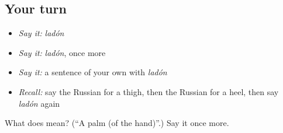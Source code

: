\subsection*{Your turn}
\begin{itemize}
\raggedright
  \item \emph{Say it:} \emph{ladón}
  \item \emph{Say it:} \emph{ladón}, once more
  \item \emph{Say it:} a sentence of your own with \emph{ladón}
  \item \emph{Recall:} say the Russian for a thigh, then the Russian for a heel, then say \emph{ladón} again
\end{itemize}

\begin{tcolorbox}[breakable,colback=teal!4,colframe=teal!35!black,title={Before you move on}]
What does  mean? (\textquotedblleft{}A palm (of the hand)\textquotedblright{}.) Say it once more.
\end{tcolorbox}
